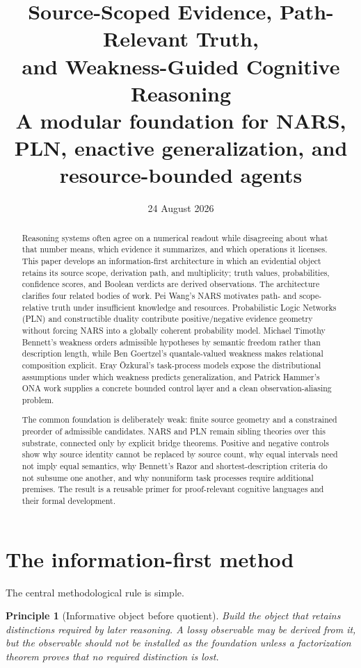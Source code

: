 \documentclass[11pt]{article}
\title{\textbf{Source-Scoped Evidence, Path-Relevant Truth,\\
and Weakness-Guided Cognitive Reasoning}\\[0.4em]
\large A modular foundation for NARS, PLN, enactive generalization,
and resource-bounded agents}
\author{}
\date{24 August 2026}
\newtheorem{principle}[definition]{Principle}
\theoremstyle{remark}
\begin{document}
\maketitle

\begin{abstract}
Reasoning systems often agree on a numerical readout while disagreeing about
what that number means, which evidence it summarizes, and which operations it
licenses.  This paper develops an information-first architecture in which an
evidential object retains its source scope, derivation path, and multiplicity;
truth values, probabilities, confidence scores, and Boolean verdicts are
derived observations.  The architecture clarifies four related bodies of
work.  Pei Wang's NARS motivates path- and scope-relative truth under
insufficient knowledge and resources.  Probabilistic Logic Networks (PLN) and
constructible duality contribute positive/negative evidence geometry without
forcing NARS into a globally coherent probability model.  Michael Timothy
Bennett's weakness orders admissible hypotheses by semantic freedom rather
than description length, while Ben Goertzel's quantale-valued weakness makes
relational composition explicit.  Eray \"Ozkural's task-process models expose
the distributional assumptions under which weakness predicts
generalization, and Patrick Hammer's ONA work supplies a concrete bounded
control layer and a clean observation-aliasing problem.

The common foundation is deliberately weak: finite source geometry and a
constrained preorder of admissible candidates.  NARS and PLN remain sibling
theories over this substrate, connected only by explicit bridge theorems.
Positive and negative controls show why source identity cannot be replaced by
source count, why equal intervals need not imply equal semantics, why
Bennett's Razor and shortest-description criteria do not subsume one another,
and why nonuniform task processes require additional premises.  The result is
a reusable primer for proof-relevant cognitive languages and their formal
development.
\end{abstract}

\tableofcontents

\section{The information-first method}

The central methodological rule is simple.

\begin{principle}[Informative object before quotient]
Build the object that retains distinctions required by later reasoning.  A
lossy observable may be derived from it, but the observable should not be
installed as the foundation unless a factorization theorem proves that no
required distinction is lost.
\end{principle}
\end{document}
